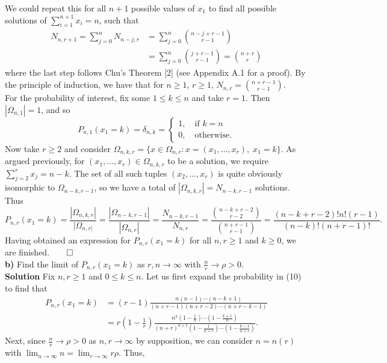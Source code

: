 \documentclass[10pt]{article}
\newcommand{\1}[1]{\mathbbm{1}_{#1}}
\newcommand{\nck}[2]{{#1\choose#2}}
\begin{document}
    We could repeat this for all $n+1$ possible values of $x_1$ to find all possible solutions of $\sum_{i=1}^{n+1}x_i=n$, such that
    \begin{align*}
        N_{n,r+1}=\sum_{j=0}^n N_{n-j,r}&=\sum_{j=0}^n \nck{n-j+r-1}{r-1}\tag{by inductive hypothesis}\\
        &=\sum_{j=0}^n\nck{j+r-1}{r-1}=\nck{n+r}{r}\tag{9}
    \end{align*}
    where the last step follows Chu's Theorem [2] (see Appendix A.1 for a proof). By the principle of induction,
    we have that for $n\geq 1$, $r\geq 1$, $N_{n,r}=\nck{n+r-1}{r-1}$.\\[5pt]
    For the probability of interest, fix some $1\leq k\leq n$ and take $r=1$. Then $|\Omega_{n,1}|=1$, and so
    \[P_{n,1}(x_1=k)=\delta_{n,k}=\begin{cases}
        1,\quad\text{if $k=n$}\\
        0,\quad\text{otherwise.}
    \end{cases}\]
    Now take $r\geq 2$ and consider $\Omega_{n,k,r}=\{x\in\Omega_{n,r}:x=(x_1,\dots,x_r),\;x_1=k\}$. As argued previously, for $(x_1,\dots,x_r)\in\Omega_{n,k,r}$ to be a solution, we require $\sum_{j=2}^rx_j=n-k$. The set of all such tuples $(x_2,\dots,x_r)$ is
    quite obviously isomorphic to $\Omega_{n-k,r-1}$, so we have a total of $|\Omega_{n,k,r}|=N_{n-k,r-1}$ solutions. Thus
    \[P_{n,r}(x_1=k)=\frac{|\Omega_{n,k,r}|}{|\Omega_{n,r|}}=\frac{|\Omega_{n-k,r-1}|}{|\Omega_{n,r}|}=\frac{N_{n-k,r-1}}{N_{n,r}}=\frac{\nck{n-k+r-2}{r-2}}{\nck{n+r-1}{r-1}}=\frac{(n-k+r-2)!n!(r-1)}{(n-k)!(n+r-1)!}.\tag{10}\]
    Having obtained an expression for $P_{n,r}(x_1=k)$ for all $n,r\geq 1$ and $k\geq 0$, we are finished.\hfill{$\qed$}\\[5pt]
    {\bf b)} Find the limit of $P_{n,r}(x_1=k)$ as $r,n\rightarrow\infty$ with $\frac{n}{r}\rightarrow\rho>0$.\\[5pt]
    {\bf Solution}\hspace{5pt} Fix $n,r\geq 1$ and $0\leq k\leq n$. Let us first expand the probability in (10) to find that
    \begin{align*}
        P_{n,r}(x_1=k)&=(r-1)\frac{{n(n-1)\cdots(n-k+1)}}{(n+r-1)(n+r-2)\cdots(n+r-k-1)}\\
        &=r(1-\frac{1}{r})\frac{n^k(1-\frac{1}{n})\cdots(1-\frac{k+1}{n})}{(n+r)^{k+1}(1-\frac{1}{n+r})\cdots(1-\frac{k-1}{n+r})}.
    \end{align*}
    Next, since $\frac{n}{r}\rightarrow\rho>0$ as $n,r\rightarrow\infty$ by supposition, we can consider $n=n(r)$ with $\lim_{n\rightarrow\infty}n=\lim_{r\rightarrow\infty}r\rho$. Thus,
\end{document}
